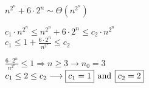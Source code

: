 \newpage

\(n^{2^n} + 6\cdot2^n  \sim \Theta(n^{2^n})\)\\[0.15cm]

\begin{center}
 \(c_1\cdot n^{2^n} \leq n^{2^n} + 6\cdot2^n \leq c_2 \cdot n^{2^n}  \)\\[0.15cm]
\(c_1 \leq 1 + \frac{6\cdot2^n}{n^{2^n}} \leq c_2\)

   
\end{center}

\begin{center}
\( \frac{6\cdot2^n}{n^{2^n}} \leq 1 \Longrightarrow n\geq 3 \longrightarrow \boxed{n_0 = 3} \)\\[0.4cm]
\(c_1 \leq 2 \leq c_2 \longrightarrow \boxed{c_1 = 1} \hspace{0.15cm} \text{and} \hspace{0.15cm} \boxed{c_2 =2}\)
\end{center}


